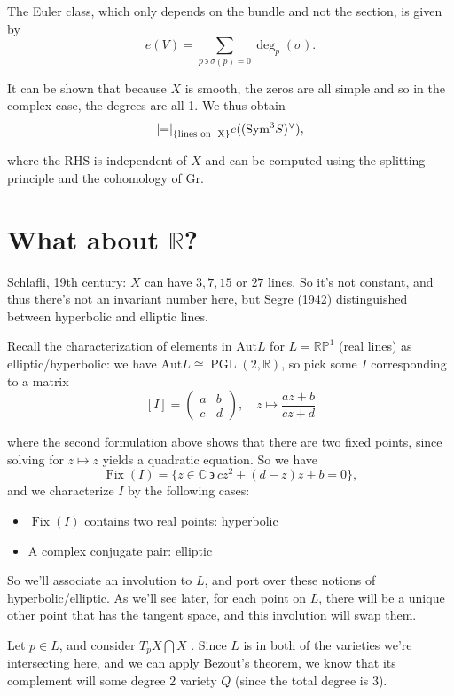 \documentclass[11pt]{scrreprt}
\theoremstyle{definition}
\newcommand{\RR}[0]{{\mathbb{R}}}
\newcommand{\CC}[0]{{\mathbb{C}}}
\newcommand{\RP}[0]{{\mathbb{RP}}}
\newcommand{\Gr}[0]{{\text{Gr}}}
\newcommand{\dual}[0]{\vee}
\newcommand{\sym}[0]{\mathrm{Sym}}
\newcommand{\suchthat}[0]{{~\backepsilon ~}}
\newcommand{\theset}[1]{\{{#1}\}}
\newcommand{\abs}[2]{{\left\lvert #2 \right\rvert_{\text{#1}}}}
\newcommand{\intersect}[0]{\bigcap}
\newcommand{\Aut}[0]{{\text{Aut}}}
\begin{document}
The Euler class, which only depends on the bundle and not the section,
is given by \[
e(V) = \sum_{p\suchthat \sigma(p) = 0} \deg_p(\sigma).
\]

It can be shown that because \(X\) is smooth, the zeros are all simple
and so in the complex case, the degrees are all 1. We thus obtain \[
\abs{\theset{\text{lines on } X}} = e((\sym^3 S)^\dual),
\]

where the RHS is independent of \(X\) and can be computed using the
splitting principle and the cohomology of \(\Gr\).

\hypertarget{what-about-rr}{%
\section{\texorpdfstring{What about
\(\RR\)?}{What about \textbackslash{}RR?}}\label{what-about-rr}}

Schlafli, 19th century: \(X\) can have \(3,7,15\) or \(27\) lines. So
it's not constant, and thus there's not an invariant number here, but
Segre (1942) distinguished between hyperbolic and elliptic lines.

Recall the characterization of elements in \(\Aut L\) for \(L=\RP^1\)
(real lines) as elliptic/hyperbolic: we have
\(\Aut L \cong \operatorname{PGL}(2, \RR)\), so pick some \(I\) corresponding
to a matrix \[
[I] = \begin{pmatrix}a & b \\ c & d\end{pmatrix},\quad  z\mapsto \frac{az+b}{cz+d}
\]

where the second formulation above shows that there are two fixed
points, since solving for \(z\mapsto z\) yields a quadratic equation. So
we have \[
\operatorname{Fix}(I) = \theset{z \in \CC \suchthat cz^2 + (d-z)z + b = 0},
\] and we characterize \(I\) by the following cases:
\begin{itemize}
  \item \(\operatorname{Fix}(I)\) contains two real points: hyperbolic
  \item A complex conjugate pair: elliptic
\end{itemize}

So we'll associate an involution to \(L\), and port over these notions
of hyperbolic/elliptic. As we'll see later, for each point on \(L\),
there will be a unique other point that has the tangent space, and this
involution will swap them.

Let \(p\in L\), and consider \(T_pX \intersect X\) . Since \(L\) is in
both of the varieties we're intersecting here, and we can apply Bezout's
theorem, we know that its complement will some degree 2 variety \(Q\)
(since the total degree is 3).
\end{document}
